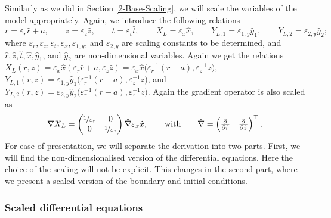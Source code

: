 \documentclass[11pt]{article}
\begin{document}
Similarly as we did in Section \ref{2-Base-Scaling}, 
we will scale the variables of the model appropriately. Again, we introduce the following relations
\[
    r = \varepsilon_r \hat{r} + a,
    \qquad
    z = \varepsilon_z \hat{z},
    \qquad
    t = \varepsilon_t \hat{t},
    \qquad
    X_L = \varepsilon_x \hat{x},
    \qquad
    Y_{L,1} = \varepsilon_{1,y} \hat{y}_1,
    \qquad
    Y_{L,2} = \varepsilon_{2,y} \hat{y}_2;
\]
where \( \varepsilon_r, \varepsilon_z, \varepsilon_t, \varepsilon_x, \varepsilon_{1,y}\), and \(\varepsilon_{2,y}\) are scaling constants to be determined, and \(\hat{r}, \hat z, \hat t, \hat x, \hat y_1\), and \(\hat y_2\) are non-dimensional variables.
Again we get the relations \(X_L(r,z) = \varepsilon_x \hat{x} (\varepsilon_r \hat r + a, \varepsilon_z \hat z) = \varepsilon_x \hat{x} \big( \varepsilon_r^{-1} (r-a) , \varepsilon_z^{-1} z\big) \), \(Y_{L,1} (r,z) = \varepsilon_{1,y} \hat{y}_1 \big( \varepsilon_r^{-1} (r-a), \varepsilon_z^{-1} z \big)\), and \(Y_{L,2} (r,z) = \varepsilon_{2,y} \hat{y}_2 \big( \varepsilon_r^{-1} (r-a), \varepsilon_z^{-1} z \big)\). Again the gradient operator is also scaled as
\[
    \nabla X_L =
    \begin{pmatrix}
        \nicefrac{1}{\varepsilon_r} & 0 \\
        0 & \nicefrac{1}{\varepsilon_z}
    \end{pmatrix}
    \hat{\nabla} \varepsilon_x \hat{x},
    \qquad \text{with} \qquad
    \hat{\nabla} = 
    \begin{pmatrix}
        \pd{ }{\hat r}
        &
        \pd{ }{\hat z}
    \end{pmatrix}^\top .
\]
For ease of presentation, we will separate the derivation into two parts. First, we will find the non-dimensionalised version of the differential equations. Here the choice of the scaling will not be explicit. This changes in the second part, where we present a scaled version of the boundary and initial conditions.

\subsubsection{Scaled differential equations}
\end{document}
